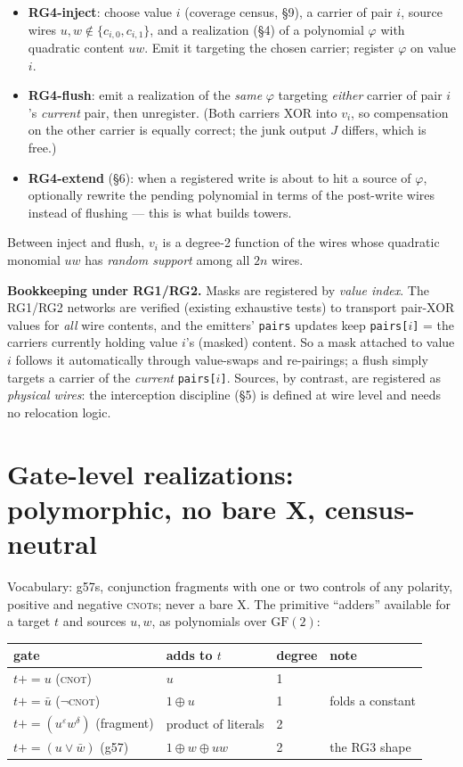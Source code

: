 \documentclass[11pt]{article}
\newcommand{\CNOT}{\textsc{cnot}}
\newcommand{\code}[1]{\texttt{#1}}
\newcommand{\gf}{\mathrm{GF}(2)}
\newcommand{\pe}{\mathrel{{+}{=}}}    %
\begin{document}
\begin{itemize}
\item \textbf{RG4-inject}: choose value $i$ (coverage census, \S9),
a carrier of pair $i$, source wires $u, w \notin \{c_{i,0}, c_{i,1}\}$,
and a realization (\S4) of a polynomial $\varphi$ with quadratic content
$u w$. Emit it targeting the chosen carrier; register $\varphi$ on value
$i$.
\item \textbf{RG4-flush}: emit a realization of the \emph{same} $\varphi$
targeting \emph{either} carrier of pair $i$'s \emph{current} pair, then
unregister. (Both carriers XOR into $v_i$, so compensation on the other
carrier is equally correct; the junk output $J$ differs, which is free.)
\item \textbf{RG4-extend} (\S6): when a registered write is about to hit a
source of $\varphi$, optionally rewrite the pending polynomial in terms of
the post-write wires instead of flushing --- this is what builds towers.
\end{itemize}

Between inject and flush, $v_i$ is a degree-2 function of the wires whose
quadratic monomial $u w$ has \emph{random support} among all $2n$ wires.

\textbf{Bookkeeping under RG1/RG2.} Masks are registered by \emph{value
index}. The RG1/RG2 networks are verified (existing exhaustive tests) to
transport pair-XOR values for \emph{all} wire contents, and the emitters'
\code{pairs} updates keep \code{pairs[$i$]} = the carriers currently
holding value $i$'s (masked) content. So a mask attached to value $i$
follows it automatically through value-swaps and re-pairings; a flush
simply targets a carrier of the \emph{current} \code{pairs[$i$]}. Sources,
by contrast, are registered as \emph{physical wires}: the interception
discipline (\S5) is defined at wire level and needs no relocation logic.

\section{Gate-level realizations: polymorphic, no bare X, census-neutral}

Vocabulary: g57s, conjunction fragments with one or two controls of any
polarity, positive and negative \CNOT{}s; never a bare X. The primitive
``adders'' available for a target $t$ and sources $u, w$, as polynomials
over $\gf$:

\begin{center}
\begin{tabular}{llll}
\toprule
gate & adds to $t$ & degree & note \\
\midrule
$t \pe u$ (\CNOT) & $u$ & 1 & \\
$t \pe \bar u$ ($\lnot$\CNOT) & $1 \oplus u$ & 1 & folds a constant \\
$t \pe (u^{\varepsilon} w^{\delta})$ (fragment) & product of literals & 2 & \\
$t \pe (u \vee \bar w)$ (g57) & $1 \oplus w \oplus u w$ & 2 & the RG3 shape \\
\bottomrule
\end{tabular}
\end{center}
\end{document}
